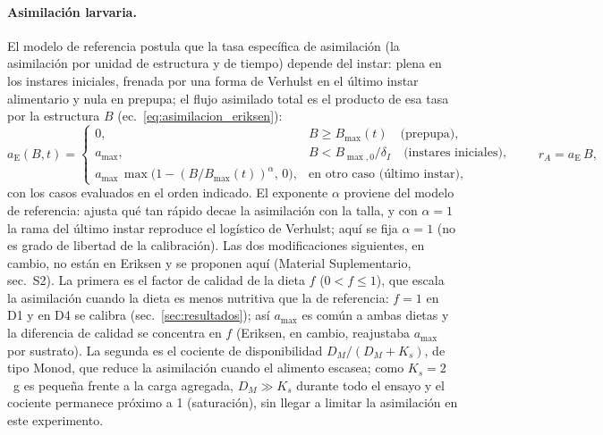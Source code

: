 \paragraph{Asimilación larvaria.}
El modelo de referencia \parencite{eriksenDynamicModellingFeed2022} postula que la tasa específica de asimilación (la asimilación por unidad de estructura y de tiempo) depende del instar: plena en los instares iniciales, frenada por una forma de Verhulst en el último instar alimentario y nula en prepupa; el flujo asimilado total es el producto de esa tasa por la estructura $B$ (ec.~\ref{eq:asimilacion_eriksen}):
\begin{equation}
a_{\mathrm{E}}(B, t) =
\begin{cases}
0, & B \ge B_{\max}(t) \quad \text{(prepupa)},\\[2pt]
a_{\max}, & B < B_{\max,0}/\delta_I \quad \text{(instares iniciales)},\\[2pt]
a_{\max}\,\max\!\big(1 - (B/B_{\max}(t))^{\alpha},\, 0\big),
   & \text{en otro caso (último instar)},
\end{cases}
\qquad r_A = a_{\mathrm{E}}\,B,
\label{eq:asimilacion_eriksen}
\end{equation}
con los casos evaluados en el orden indicado. El exponente $\alpha$ proviene del modelo de referencia: ajusta qué tan rápido decae la asimilación con la talla, y con $\alpha = 1$ la rama del último instar reproduce el logístico de Verhulst; aquí se fija $\alpha = 1$ (no es grado de libertad de la calibración). Las dos modificaciones siguientes, en cambio, no están en Eriksen y se proponen aquí (Material Suplementario, sec.~S2). La primera es el factor de calidad de la dieta $f$ ($0 < f \le 1$), que escala la asimilación cuando la dieta es menos nutritiva que la de referencia: $f = 1$ en D1 y en D4 se calibra (sec.~\ref{sec:resultados}); así $a_{\max}$ es común a ambas dietas y la diferencia de calidad se concentra en $f$ (Eriksen, en cambio, reajustaba $a_{\max}$ por sustrato). La segunda es el cociente de disponibilidad $D_M/(D_M + K_s)$, de tipo Monod, que reduce la asimilación cuando el alimento escasea; como $K_s = 2$~g es pequeña frente a la carga agregada, $D_M \gg K_s$ durante todo el ensayo y el cociente permanece próximo a 1 (saturación), sin llegar a limitar la asimilación en este experimento.

